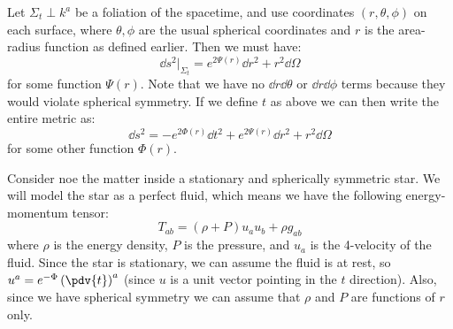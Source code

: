 \documentclass{jknotes}
\begin{document}
Let \(\Sigma_t \perp k^a\) be a foliation of the spacetime, and use coordinates \((r,\theta,\phi)\) on each surface, where \(\theta,\phi\) are the usual spherical coordinates and \(r\) is the area-radius function as defined earlier. Then we must have:
\begin{equation}
    \dd{s}^2|_{\Sigma_t} = e^{2\Psi(r)}\dd{r}^2 + r^2\dd{\Omega}
\end{equation}
for some function \(\Psi(r)\). Note that we have no \(\dd{r}\dd{\theta}\) or \(\dd{r}\dd{\phi}\) terms because they would violate spherical symmetry. If we define \(t\) as above we can then write the entire metric as:
\begin{equation}
    \dd{s}^2 = -e^{2\Phi(r)}\dd{t}^2 + e^{2\Psi(r)}\dd{r}^2 + r^2\dd{\Omega}
\end{equation}
for some other function \(\Phi(r)\).

Consider noe the matter inside a stationary and spherically symmetric star. We will model the star as a perfect fluid, which means we have the following energy-momentum tensor:
\begin{equation}
    T_{ab} = (\rho+P)u_au_b + \rho g_{ab}
\end{equation}
where \(\rho\) is the energy density, \(P\) is the pressure, and \(u_a\) is the 4-velocity of the fluid. Since the star is stationary, we can assume the fluid is at rest, so \(u^a = e^{-\Phi}\left( \pdv{t} \right)^a\) (since \(u\) is a unit vector pointing in the \(t\) direction). Also, since we have spherical symmetry we can assume that \(\rho\) and \(P\) are functions of \(r\) only.
\end{document}

